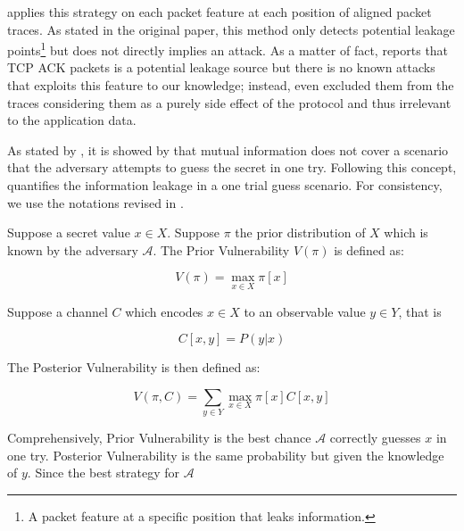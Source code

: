 \cite{PinpointWeb} applies this strategy on each packet feature at each position of aligned packet traces. As stated in the original paper, this method only detects potential leakage points\footnote{A packet feature at a specific position that leaks information.} but does not directly implies an attack. As a matter of fact, \cite{PinpointWeb} reports that TCP ACK packets is a potential leakage source but there is no known attacks that exploits this feature to our knowledge; instead, \cite{PClassifier} even excluded them from the traces considering them as a purely side effect of the protocol and thus irrelevant to the application data.

As stated by \cite{OneTryGuess}, it is showed by \cite{OneTryGuessOrigin} that mutual information does not cover a scenario that the adversary attempts to guess the secret in one try. Following this concept, \cite{OneTryGuess} quantifies the information leakage in a one trial guess scenario. For consistency, we use the notations revised in \cite{GLeakage}. 

\begin{definition}
	Suppose a secret value $x \in X$. Suppose $\pi$ the prior distribution of $X$ which is known by the adversary $\mathcal{A}$. The Prior Vulnerability $V(\pi)$ is defined as:
	
	\begin{equation}
		V(\pi) = \max_{x \in X}{\pi[x]}
	\end{equation}
	
	Suppose a channel $C$ which encodes $x \in X$ to an observable value $y \in Y$, that is
	
	\begin{equation}
		C[x,y] = P(y | x)
	\end{equation}
	
	The Posterior Vulnerability is then defined as:
	
	\begin{equation}
		V(\pi, C) = \sum_{y \in Y}{\max_{x \in X}{\pi[x]C[x,y]}} 
	\end{equation}
	
\end{definition}

Comprehensively, Prior Vulnerability is the best chance  $\mathcal{A}$ correctly guesses $x$ in one try. Posterior Vulnerability is the same probability but given the knowledge of $y$. Since the best strategy for $\mathcal{A}$

